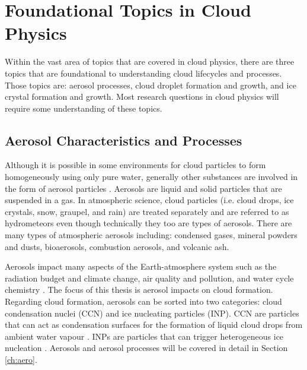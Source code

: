 \section{Foundational Topics in Cloud Physics}
Within the vast area of topics that are covered in cloud physics, there are three topics that are foundational to understanding cloud lifecycles and processes. Those topics are: aerosol processes, cloud droplet formation and growth, and ice crystal formation and growth. Most research questions in cloud physics will require some understanding of these topics.

\subsection{Aerosol Characteristics and Processes}
Although it is possible in some environments for cloud particles to form homogeneously using only pure water, generally other substances are involved in the form of aerosol particles \citep{rog1989,lamb2011}. Aerosols are liquid and solid particles that are suspended in a gas. In atmospheric science, cloud particles (i.e. cloud drops, ice crystals, snow, graupel, and rain) are treated separately and are referred to as hydrometeors even though technically they too are types of aerosols. \citep{bouc2015} There are many types of atmospheric aerosols including: condensed gases, mineral powders and dusts, bioaerosols, combustion aerosols, and volcanic ash. 

Aerosols impact many aspects of the Earth-atmosphere system such as the radiation budget and climate change, air quality and pollution, and water cycle chemistry \citep{bouc2015}. The focus of this thesis is aerosol impacts on cloud formation. Regarding cloud formation, aerosols can be sorted into two categories: cloud condensation nuclei (CCN) and ice nucleating particles (INP). CCN are particles that can act as condensation surfaces for the formation of liquid cloud drops from ambient water vapour \citep{rog1989,bouc2015}. INPs are particles that can trigger heterogeneous ice nucleation \citep{vali2015}. Aerosols and aerosol processes will be covered in detail in Section \ref{ch:aero}.

